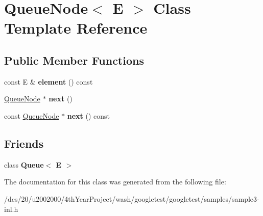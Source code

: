 \hypertarget{classQueueNode}{}\section{Queue\+Node$<$ E $>$ Class Template Reference}
\label{classQueueNode}
\subsection*{Public Member Functions}
\begin{DoxyCompactItemize}
\item 
\mbox{\label{classQueueNode_a1c61b3ed32e089f5901b87022ef84985}} 
const E \& {\bfseries element} () const
\item 
\mbox{\label{classQueueNode_a8a9fdf488da06533360999ef85db56ea}} 
\mbox{\hyperlink{classQueueNode}{Queue\+Node}} $\ast$ {\bfseries next} ()
\item 
\mbox{\label{classQueueNode_ada477e4f309f29383112dbda473dd985}} 
const \mbox{\hyperlink{classQueueNode}{Queue\+Node}} $\ast$ {\bfseries next} () const
\end{DoxyCompactItemize}
\subsection*{Friends}
\begin{DoxyCompactItemize}
\item 
\mbox{\label{classQueueNode_ad4336229b1d7c3626e4ba69f236b202d}} 
class {\bfseries Queue$<$ E $>$}
\end{DoxyCompactItemize}


The documentation for this class was generated from the following file\+:\begin{DoxyCompactItemize}
\item 
/dcs/20/u2002000/4th\+Year\+Project/wash/googletest/googletest/samples/sample3-\/inl.\+h\end{DoxyCompactItemize}
